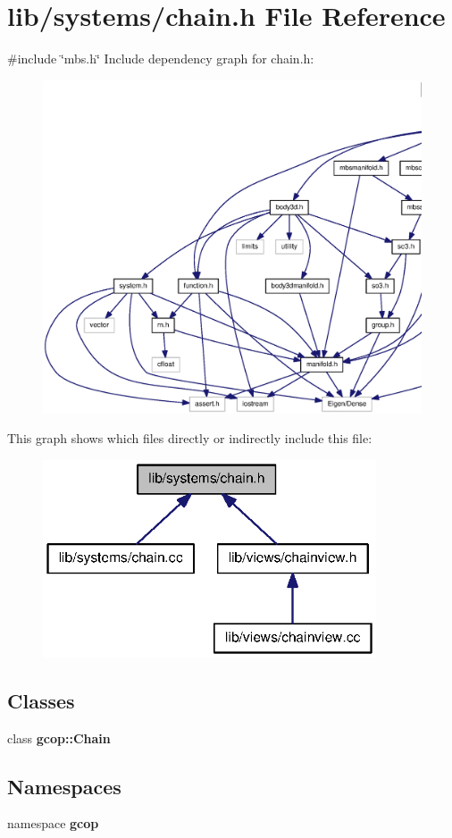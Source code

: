\section{lib/systems/chain.h \-File \-Reference}
\label{chain_8h}
{\ttfamily \#include \char`\"{}mbs.\-h\char`\"{}}\*
\-Include dependency graph for chain.\-h\-:
\nopagebreak
\begin{figure}[H]
\begin{center}
\leavevmode
\includegraphics[width=350pt]{chain_8h__incl}
\end{center}
\end{figure}
\-This graph shows which files directly or indirectly include this file\-:
\nopagebreak
\begin{figure}[H]
\begin{center}
\leavevmode
\includegraphics[width=280pt]{chain_8h__dep__incl}
\end{center}
\end{figure}
\subsection*{\-Classes}
\begin{DoxyCompactItemize}
\item 
class {\bf gcop\-::\-Chain}
\end{DoxyCompactItemize}
\subsection*{\-Namespaces}
\begin{DoxyCompactItemize}
\item 
namespace {\bf gcop}
\end{DoxyCompactItemize}
